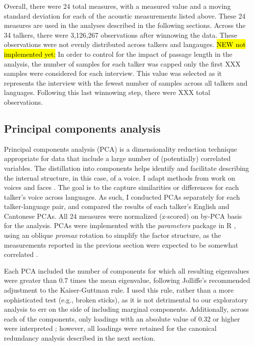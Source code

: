 Overall, there were 24 total measures, with a measured value and a moving standard deviation for each of the acoustic measurements listed above. These 24 measures are used in the analyses described in the following sections. Across the 34 talkers, there were 3,126,267 observations after winnowing the data. These observations were not evenly distributed across talkers and langauges. \hl{NEW not implemented yet:} In order to control for the impact of passage length in the analysis, the number of samples for each talker was capped only the first XXX samples were considered for each interview. This value was selected as it represents the interview with the fewest number of samples across all talkers and languages. Following this last winnowing step, there were XXX total observations. 

\subsection{Principal components analysis}\label{ch3:sec:pca}

Principal components analysis (PCA) is a dimensionality reduction technique appropriate for data that include a large number of (potentially) correlated variables. The distillation into components helps identify and facilitate describing the internal structure, in this case, of a voice. I adapt methods from work on voices \citep{lee_2019_acoustic-paper} and faces \citep{burton_2016_faces,turk_1991_eigenfaces}. The goal is to the capture similarities or differences for each talker's voice across languages. As such, I conducted PCAs separately for each talker-language pair, and compared the results of each talker's English and Cantonese PCAs. All 24 measures were normalized (z-scored) on by-PCA basis for the analysis. PCAs were implemented with the \textit{parameters} package \citep{makowski_2019_parameters} in R \citep{r_2021}, using an oblique \textit{promax} rotation to simplify the factor structure, as the measurements reported in the previous section were expected to be somewhat correlated \citep{lee_2019_acoustic-paper}.

Each PCA included the number of components for which all resulting eigenvalues were greater than 0.7 times the mean eigenvalue, following Jolliffe's \citep{jolliffe_2002_pca} recommended adjustment to the Kaiser-Guttman rule. I used this rule, rather than a more sophisticated test (e.g., broken sticks), as it is not detrimental to our exploratory analysis to err on the side of including marginal components. Additionally, across each of the components, only loadings with an absolute value of 0.32 or higher were interpreted \citep{lee_2019_acoustic-paper,tabachnick_2013_statistics}; however, all loadings were retained for the canonical redundancy analysis described in the next section.

